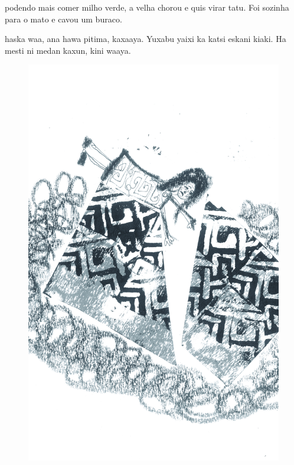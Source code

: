  podendo mais comer milho verde,
a velha chorou e quis virar tatu.
Foi sozinha para o mato e cavou um buraco.

\vspace{2em}

 haska waa, ana hawa pitima,
kaxaaya. Yuxabu yaixi ka katsi eskani kiaki.
Ha mesti ni medan kaxun, kini waaya.

\vspace*{\fill}

\pagebreak
\thispagestyle{empty}
\begin{figure}
\vspace*{-1.6cm}
\hspace*{-2.2cm}\includegraphics[width=138mm]{./imgs/img7.jpg}
\end{figure}

